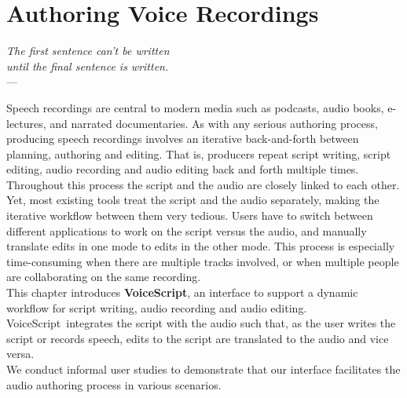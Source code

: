 \newcommand{\voicescript}[0]{VoiceScript}
\chapter{Authoring Voice Recordings} %
\label{ch:voicescript} %

\begin{flushright}{\slshape    
The first sentence can't be written \\
until the final sentence is written.}\\ \medskip
---  \citep{oates:1989}
\end{flushright}
Speech recordings are central to modern media such as podcasts, audio books, e-lectures, and narrated documentaries. As with any serious authoring process, producing speech recordings involves an iterative back-and-forth between planning, authoring and editing. That is, producers repeat script writing, script editing, audio recording and audio editing back and forth multiple times. Throughout this process the script and the audio are closely linked to each other.\\

Yet, most existing tools treat the script and the audio separately, making the iterative workflow between them very tedious. Users have to switch between different applications to work on the script versus the audio, and manually translate edits in one mode to edits in the other mode. This process is especially time-consuming when there are multiple tracks involved, or when multiple people are collaborating on the same recording.\\

This chapter introduces \textbf{\voicescript}, an interface to support a dynamic workflow for script writing, audio recording and audio editing. \voicescript\ integrates the script with the audio such that, as the user writes the script or records speech, edits to the script are translated to the audio and vice versa.\\

We conduct informal user studies to demonstrate that our interface facilitates the audio authoring process in various scenarios. 
%
